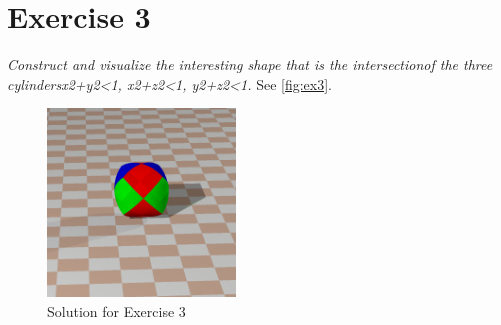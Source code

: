 \section{Exercise 3}
\textit{Construct and visualize the interesting shape that is the intersectionof the three cylindersx2+y2<1, x2+z2<1, y2+z2<1.}
See \autoref{fig:ex3}.

\begin{figure}[h]
  \centering
  \includegraphics[height=5cm]{ex3.png}
  \caption{Solution for Exercise 3}
  \label{fig:ex3}
\end{figure}